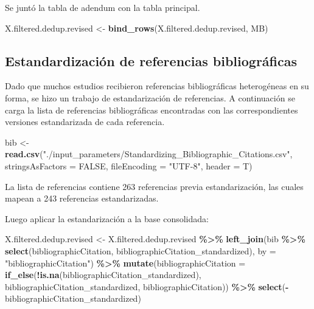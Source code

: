 \documentclass[sn-apa,pdflatex]{sn-jnl}
\newenvironment{Shaded}{\begin{snugshade}}{\end{snugshade}}
\newcommand{\AttributeTok}[1]{\textcolor[rgb]{0.13,0.29,0.53}{#1}}
\newcommand{\ConstantTok}[1]{\textcolor[rgb]{0.56,0.35,0.01}{#1}}
\newcommand{\FunctionTok}[1]{\textcolor[rgb]{0.13,0.29,0.53}{\textbf{#1}}}
\newcommand{\NormalTok}[1]{#1}
\newcommand{\OtherTok}[1]{\textcolor[rgb]{0.56,0.35,0.01}{#1}}
\newcommand{\SpecialCharTok}[1]{\textcolor[rgb]{0.81,0.36,0.00}{\textbf{#1}}}
\newcommand{\StringTok}[1]{\textcolor[rgb]{0.31,0.60,0.02}{#1}}
\begin{document}
Se juntó la tabla de adendum con la tabla principal.

\begin{Shaded}
\begin{Highlighting}[]
\NormalTok{X.filtered.dedup.revised }\OtherTok{\textless{}{-}} \FunctionTok{bind\_rows}\NormalTok{(X.filtered.dedup.revised,}
\NormalTok{    MB)}
\end{Highlighting}
\end{Shaded}

\subsection{Estandardización de referencias
bibliográficas}\label{estandardizaciuxf3n-de-referencias-bibliogruxe1ficas}

Dado que muchos estudios recibieron referencias bibliográficas
heterogéneas en su forma, se hizo un trabajo de estandarización de
referencias. A continuación se carga la lista de referencias
bibliográficas encontradas con las correspondientes versiones
estandarizada de cada referencia.

\begin{Shaded}
\begin{Highlighting}[]
\NormalTok{bib }\OtherTok{\textless{}{-}} \FunctionTok{read.csv}\NormalTok{(}\StringTok{"./input\_parameters/Standardizing\_Bibliographic\_Citations.csv"}\NormalTok{,}
    \AttributeTok{stringsAsFactors =} \ConstantTok{FALSE}\NormalTok{, }\AttributeTok{fileEncoding =} \StringTok{"UTF{-}8"}\NormalTok{, }\AttributeTok{header =}\NormalTok{ T)}
\end{Highlighting}
\end{Shaded}

La lista de referencias contiene 263 referencias previa estandarización,
las cuales mapean a 243 referencias estandarizadas.

Luego aplicar la estandarización a la base consolidada:

\begin{Shaded}
\begin{Highlighting}[]
\NormalTok{X.filtered.dedup.revised }\OtherTok{\textless{}{-}}\NormalTok{ X.filtered.dedup.revised }\SpecialCharTok{\%\textgreater{}\%}
    \FunctionTok{left\_join}\NormalTok{(bib }\SpecialCharTok{\%\textgreater{}\%}
        \FunctionTok{select}\NormalTok{(bibliographicCitation, bibliographicCitation\_standardized),}
        \AttributeTok{by =} \StringTok{"bibliographicCitation"}\NormalTok{) }\SpecialCharTok{\%\textgreater{}\%}
    \FunctionTok{mutate}\NormalTok{(}\AttributeTok{bibliographicCitation =} \FunctionTok{if\_else}\NormalTok{(}\SpecialCharTok{!}\FunctionTok{is.na}\NormalTok{(bibliographicCitation\_standardized),}
\NormalTok{        bibliographicCitation\_standardized, bibliographicCitation)) }\SpecialCharTok{\%\textgreater{}\%}
    \FunctionTok{select}\NormalTok{(}\SpecialCharTok{{-}}\NormalTok{bibliographicCitation\_standardized)}
\end{Highlighting}
\end{Shaded}
\end{document}
